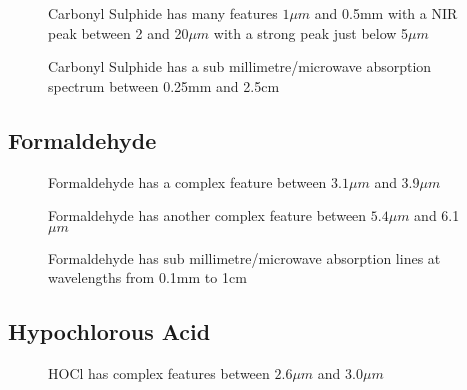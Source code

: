 \documentclass[12pt]{article}
\begin{document}
\vspace*{11.5cm}
\begin{figure}[htb]
\caption{Carbonyl Sulphide has many features  $1\mu m$
 and  0.5mm with a NIR peak between 2 and 20$\mu m$ with a strong peak
just below 5$\mu m$}
\end{figure}
\newpage


\vspace*{11.5cm}
\begin{figure}[htb]
\caption{Carbonyl Sulphide has a sub millimetre/microwave absorption spectrum
 between 0.25mm and 2.5cm}
\end{figure}
\newpage

\subsection{Formaldehyde}

\vspace*{11.5cm}
\begin{figure}[htb]
\caption{Formaldehyde has a complex feature between   $3.1\mu m$
 and 3.9$\mu m$}
\end{figure}
\newpage


\vspace*{11.5cm}
\begin{figure}[htb]
\caption{Formaldehyde has another complex feature between   $5.4\mu m$
 and 6.1$\mu m$}
\end{figure}
\newpage


\vspace*{11.5cm}
\begin{figure}[htb]
\caption{Formaldehyde has sub millimetre/microwave absorption lines at wavelengths
 from  0.1mm to 1cm}
\end{figure}
\newpage

\subsection{Hypochlorous Acid}

\vspace*{11.5cm}
\begin{figure}[htb]
\caption{HOCl has complex features between   $2.6\mu m$
 and 3.0$\mu m$}
\end{figure}
\newpage
\end{document}
